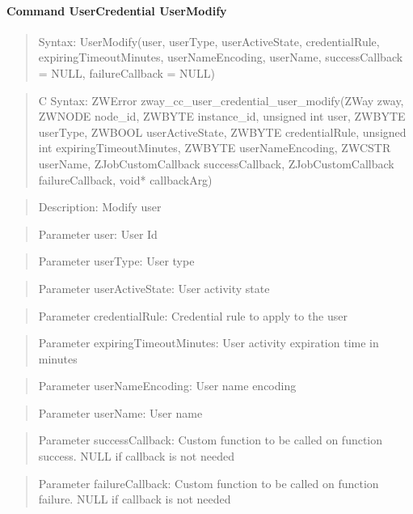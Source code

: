 \paragraph{Command UserCredential UserModify}
\begin{quote}Syntax: UserModify(user, userType, userActiveState, credentialRule, expiringTimeoutMinutes, userNameEncoding, userName, successCallback = NULL, failureCallback = NULL)\end{quote}
\begin{quote}C Syntax: ZWError zway\_cc\_user\_credential\_user\_modify(ZWay zway, ZWNODE node\_id, ZWBYTE instance\_id, unsigned int user, ZWBYTE userType, ZWBOOL userActiveState, ZWBYTE credentialRule, unsigned int expiringTimeoutMinutes, ZWBYTE userNameEncoding, ZWCSTR userName, ZJobCustomCallback successCallback, ZJobCustomCallback failureCallback, void* callbackArg)\end{quote}
\begin{quote}Description: Modify user\end{quote}
\begin{quote}Parameter user: User Id\end{quote}
\begin{quote}Parameter userType: User type\end{quote}
\begin{quote}Parameter userActiveState: User activity state\end{quote}
\begin{quote}Parameter credentialRule: Credential rule to apply to the user\end{quote}
\begin{quote}Parameter expiringTimeoutMinutes: User activity expiration time in minutes\end{quote}
\begin{quote}Parameter userNameEncoding: User name encoding\end{quote}
\begin{quote}Parameter userName: User name\end{quote}
\begin{quote}Parameter successCallback: Custom function to be called on function success. NULL if callback is not needed\end{quote}
\begin{quote}Parameter failureCallback: Custom function to be called on function failure. NULL if callback is not needed\end{quote}


